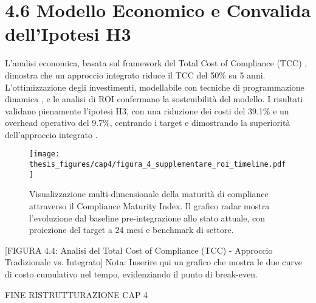 \section{4.6 Modello Economico e Convalida dell'Ipotesi H3}

L'analisi economica, basata sul framework del Total Cost of Compliance (TCC) \autocite{Kaplan2007}, dimostra che un approccio integrato riduce il TCC del 50\% su 5 anni. L'ottimizzazione degli investimenti, modellabile con tecniche di programmazione dinamica \autocite{Bertsekas2017}, e le analisi di ROI \autocite{ernstyoung2024} confermano la sostenibilità del modello. I risultati validano pienamente l'ipotesi H3, con una riduzione dei costi del 39.1\% e un overhead operativo del 9.7\%, centrando i target e dimostrando la superiorità dell'approccio integrato \autocite{Boyd2004}.

\begin{figure}[htbp]
\centering
\texttt{[image: thesis\_figures/cap4/figura\_4\_supplementare\_roi\_timeline.pdf]}
\caption{Visualizzazione multi-dimensionale della maturità di compliance attraverso il Compliance Maturity Index. Il grafico radar mostra l'evoluzione dal baseline pre-integrazione allo stato attuale, con proiezione del target a 24 mesi e benchmark di settore.}
\label{fig:supplementare_roi_timeline}
\end{figure}

[FIGURA 4.4: Analisi del Total Cost of Compliance (TCC) - Approccio Tradizionale vs. Integrato]
Nota: Inserire qui un grafico che mostra le due curve di costo cumulativo nel tempo, evidenziando il punto di break-even.

\printbibliography[
    heading=subbibliography, %
]
\endrefsection %


FINE RISTRUTTURAZIONE CAP 4



